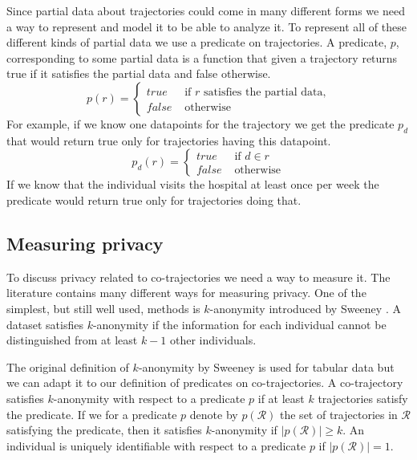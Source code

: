 \documentclass[12pt]{article}
\newcommand{\data}{d}
\newcommand{\traj}{r}
\newcommand{\cotraj}{\mathcal{R}}
\newcommand{\pred}{p}
\theoremstyle{definition}
\begin{document}
Since partial data about trajectories could come in many different
forms we need a way to represent and model it to be able to analyze
it. To represent all of these different kinds of partial data we use a
predicate on trajectories. A predicate, \(\pred\), corresponding to some
partial data is a function that given a trajectory returns true if it
satisfies the partial data and false otherwise.
\begin{equation*}
  \pred(\traj) =
  \begin{cases}
    true & \text{ if } \traj \text{ satisfies the partial data,}\\
    false & \text{ otherwise}
  \end{cases}
\end{equation*}
For example, if we know one datapoints for the trajectory we get the
predicate \(\pred_{\data}\) that would return true only for trajectories
having this datapoint.
\begin{equation*}
  \pred_{\data}(\traj) =
  \begin{cases}
    true & \text{ if } \data \in \traj\\
    false & \text{ otherwise}
  \end{cases}
\end{equation*}
If we know that the individual visits the hospital at least once per
week the predicate would return true only for trajectories doing that.

\subsection{Measuring privacy}
\label{sec:measuring-privacy}
To discuss privacy related to co-trajectories we need a way to measure
it. The literature contains many different ways for measuring privacy.
One of the simplest, but still well used, methods is \(k\)-anonymity
introduced by Sweeney \cite{sweeney_k-anonymity:_2002}. A dataset
satisfies \(k\)-anonymity if the information for each individual
cannot be distinguished from at least \(k - 1\) other individuals.

The original definition of \(k\)-anonymity by Sweeney is used for
tabular data but we can adapt it to our definition of predicates on
co-trajectories. A co-trajectory satisfies \(k\)-anonymity with
respect to a predicate \(\pred\) if at least \(k\) trajectories
satisfy the predicate. If we for a predicate \(\pred\) denote by
\(\pred(\cotraj)\) the set of trajectories in \(\cotraj\) satisfying
the predicate, then it satisfies \(k\)-anonymity if
\(|\pred(\cotraj)| \geq k\). An individual is uniquely identifiable
with respect to a predicate \(\pred\) if \(|\pred(\cotraj)| = 1\).
\end{document}
